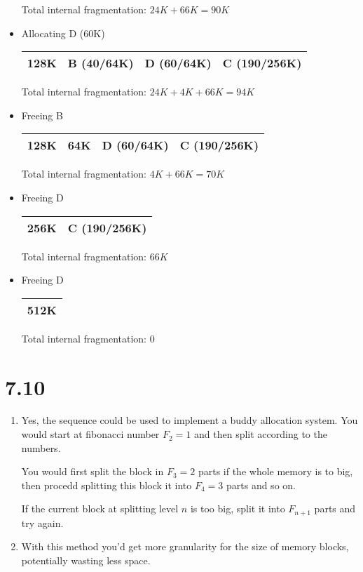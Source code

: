 \documentclass[12pt]{article}
\begin{document}
\begin{itemize}
		Total internal fragmentation: $24K + 66K = 90K$

		\item Allocating D (60K)

		\begin{tabular}{|p{}|p{}|p{}|p{}|}
			\hline
			128K & B (40/64K) & D (60/64K) & C (190/256K)\\
			\hline
		\end{tabular}

		Total internal fragmentation: $24K + 4K + 66K = 94K$

		\item Freeing B

		\begin{tabular}{|p{}|p{}|p{}|p{}|}
			\hline
			128K & 64K & D (60/64K) & C (190/256K)\\
			\hline
		\end{tabular}

		Total internal fragmentation: $4K + 66K = 70K$

		\item Freeing D

		\begin{tabular}{|p{}|p{}|}
			\hline
			256K & C (190/256K)\\
			\hline
		\end{tabular}

		Total internal fragmentation: $66K$

		\item Freeing D

		\begin{tabular}{|p{\linewidth}|}
			\hline
			512K\\
			\hline
		\end{tabular}

		Total internal fragmentation: $0$

	\end{itemize}

\section*{7.10}
\begin{enumerate}[a]
	\item %
	Yes, the sequence could be used to implement a buddy allocation system. You would start at fibonacci number $F_2 = 1$ and then split according to the numbers.

	You would first split the block in $F_3 = 2$ parts if the whole memory is to big, then procedd splitting this block it into $F_4 = 3$ parts and so on.

	If the current block at splitting level $n$ is too big, split it into $F_{n + 1}$ parts and try again.

	\item %
	With this method you'd get more granularity for the size of memory blocks, potentially wasting less space.
\end{enumerate}
\end{document}
